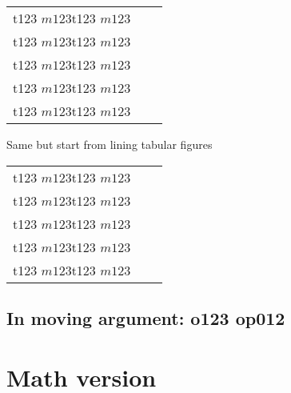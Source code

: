 \documentclass[a4paper]{article}
\begin{document}
\def\nums{t123 $m123$}
\begin{tabular}{lll}
\nums\quad\visible{(\textfigures{\nums})}\quad \nums\\
\nums\quad\visible{(\liningfigures{\nums})}\quad \nums\\
\nums\quad\visible{(\tabularfigures{\nums})}\quad \nums\\
\nums\quad\visible{(\proportionalfigures{\nums})}\quad \nums\\
\nums\quad\visible{(\tabularfigures{\liningfigures{\nums}})}\quad \nums\\
\end{tabular}

\begingroup Same but start from lining tabular figures\par
\lnfigures\tbfigures
\begin{tabular}{lll}
\nums\quad\visible{(\textfigures{\nums})}\quad \nums\\
\nums\quad\visible{(\liningfigures{\nums})}\quad \nums\\
\nums\quad\visible{(\tabularfigures{\nums})}\quad \nums\\
\nums\quad\visible{(\proportionalfigures{\nums})}\quad \nums\\
\nums\quad\visible{(\tabularfigures{\liningfigures{\nums}})}\quad \nums\\
\end{tabular}
\endgroup

\subsection{In moving argument: o123 
  op012 
  }

\tableofcontents

\section{Math version}
\end{document}
